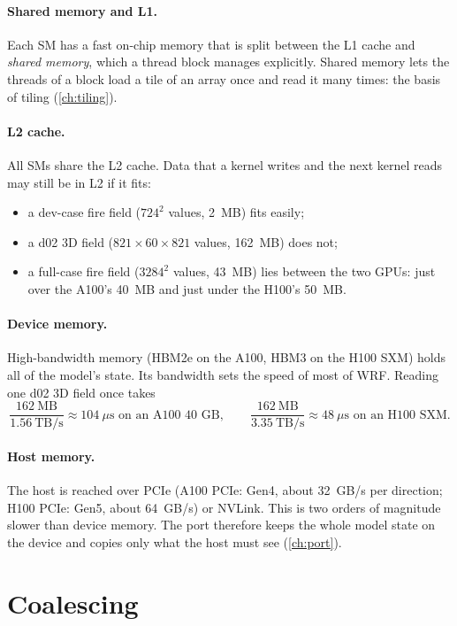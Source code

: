 \paragraph{Shared memory and L1.} Each SM has a fast on-chip memory that is split between the L1 cache and
\emph{shared memory}, which a thread block manages explicitly. Shared memory lets the threads of a block load a tile
of an array once and read it many times: the basis of tiling (\cref{ch:tiling}).

\paragraph{L2 cache.} All SMs share the L2 cache. Data that a kernel writes and the next kernel reads may still be in
L2 if it fits:
\begin{itemize}
  \item a dev-case fire field ($724^2$ values, 2~MB) fits easily;
  \item a d02 3D field ($821 \times 60 \times 821$ values, 162~MB) does not;
  \item a full-case fire field ($3284^2$ values, 43~MB) lies between the two GPUs: just over the A100's 40~MB and
    just under the H100's 50~MB.
\end{itemize}

\paragraph{Device memory.} High-bandwidth memory (HBM2e on the A100, HBM3 on the H100 SXM) holds all of the model's
state. Its bandwidth sets the speed of most of WRF. Reading one d02 3D field once takes
\begin{equation}
  \frac{162\ \text{MB}}{1.56\ \text{TB/s}} \approx 104\ \mu\text{s on an A100 40 GB}, \qquad
  \frac{162\ \text{MB}}{3.35\ \text{TB/s}} \approx 48\ \mu\text{s on an H100 SXM}.
\end{equation}

\paragraph{Host memory.} The host is reached over PCIe (A100 PCIe: Gen4, about 32~GB/s per direction; H100 PCIe:
Gen5, about 64~GB/s) or NVLink. This is two orders of magnitude slower than device memory. The port therefore keeps
the whole model state on the device and copies only what the host must see (\cref{ch:port}).

\section{Coalescing}

